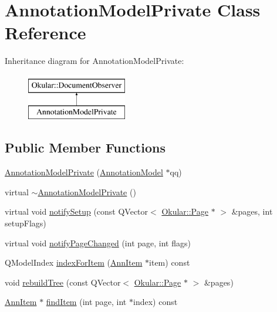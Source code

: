\hypertarget{classAnnotationModelPrivate}{\section{Annotation\+Model\+Private Class Reference}
\label{classAnnotationModelPrivate}
}
Inheritance diagram for Annotation\+Model\+Private\+:\begin{figure}[H]
\begin{center}
\leavevmode
\includegraphics[height=2.000000cm]{classAnnotationModelPrivate}
\end{center}
\end{figure}
\subsection*{Public Member Functions}
\begin{DoxyCompactItemize}
\item 
\hyperlink{classAnnotationModelPrivate_a97a20594b53559a17ded1896526b1e5c}{Annotation\+Model\+Private} (\hyperlink{classAnnotationModel}{Annotation\+Model} $\ast$qq)
\item 
virtual \hyperlink{classAnnotationModelPrivate_a402da5e1c02288e8b8d9d8cc2216dbac}{$\sim$\+Annotation\+Model\+Private} ()
\item 
virtual void \hyperlink{classAnnotationModelPrivate_aad79ea3a4f3222fd7b8aafad27fef5d7}{notify\+Setup} (const Q\+Vector$<$ \hyperlink{classOkular_1_1Page}{Okular\+::\+Page} $\ast$ $>$ \&pages, int setup\+Flags)
\item 
virtual void \hyperlink{classAnnotationModelPrivate_ac06ad6534d4368be37e97bf27b616e0a}{notify\+Page\+Changed} (int page, int flags)
\item 
Q\+Model\+Index \hyperlink{classAnnotationModelPrivate_a49c3cbd8328e431324be4fff9ac25926}{index\+For\+Item} (\hyperlink{structAnnItem}{Ann\+Item} $\ast$item) const 
\item 
void \hyperlink{classAnnotationModelPrivate_a4b78d9800d1b36e77308009d53b2fdf9}{rebuild\+Tree} (const Q\+Vector$<$ \hyperlink{classOkular_1_1Page}{Okular\+::\+Page} $\ast$ $>$ \&pages)
\item 
\hyperlink{structAnnItem}{Ann\+Item} $\ast$ \hyperlink{classAnnotationModelPrivate_a082a44f62811ca44738a656492e03916}{find\+Item} (int page, int $\ast$index) const 
\end{DoxyCompactItemize}
